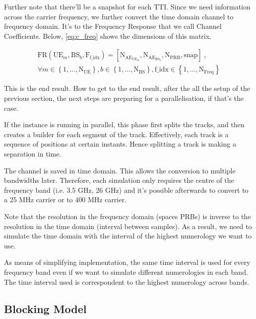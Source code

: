 Further note that there'll be a snapshot for each \acs{TTI}.
Since we need information across the carrier frequency, we further convert the time domain channel to frequency domain. It's to the Frequency Response that we call Channel Coefficients. Below, \eqref{eq:c_freq} shows the dimensions of this matrix. 

\begin{gather} \label{eq:c_freq}
    \text{FR}(\text{UE}_m, \text{BS}_b, \text{F}_\text{f\_idx}) = [\text{N}_{\text{AE}_{\text{UE}_m}}, \text{N}_{\text{AE}_{\text{BS}_b}}, \text{N}_\text{PRB}, \text{snap}] \ , \\
    \forall m \in \left\{1, \dots, \text{N}_\text{UE}\right\}, b \in \left\{1, \dots, \text{N}_\text{BS}\right\} \nonumber, \text{f\_idx} \in \left\{1, ..., \text{N}_\text{Freq} \right\}
\end{gather}


This is the end result. How to get to the end result, after the all the setup of the previous section, the next steps are preparing for a parallelisation, if that's the case.

If the instance is running in parallel, this phase first splits the tracks, and then creates a builder for each segment of the track. Effectively, each track is a sequence of positions at certain instants. Hence splitting a track is making a separation in time.


The channel is saved in time domain. This allows the conversion to multiple bandwidths later. Therefore, each simulation only requires the centre of the frequency band (i.e. 3.5 GHz, 26 GHz) and it's possible afterwards to convert to a 25 MHz carrier or to 400 MHz carrier. 

Note that the resolution in the frequency domain (spaces \acsp{PRB}) is inverse to the resolution in the time domain (interval between samples). As a result, we need to simulate the time domain with the interval of the highest numerology we want to use.

As means of simplifying implementation, the same time interval is used for every frequency band even if we want to simulate different numerologies in each band. The time interval used is correspondent to the highest numerology across bands.



\subsection{Blocking Model}

